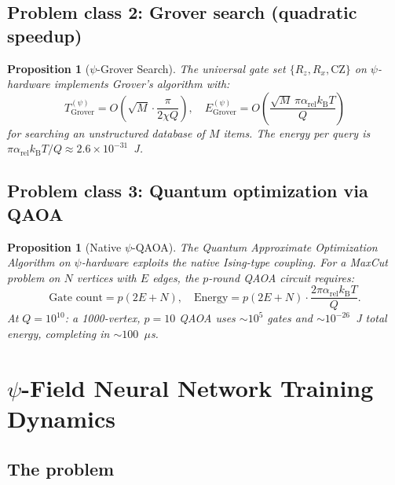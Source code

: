 \documentclass[11pt]{article}
\newtheorem{proposition}[theorem]{Proposition}
\theoremstyle{definition}
\theoremstyle{remark}
\newcommand{\kB}{k_{\mathrm{B}}}
\newcommand{\arel}{\alpha_{\mathrm{rel}}}
\begin{document}
\subsection{Problem class 2: Grover search (quadratic speedup)}

\begin{proposition}[$\psi$-Grover Search]
The universal gate set $\{R_z, R_x, \mathrm{CZ}\}$ on $\psi$-hardware
implements Grover's algorithm with:
\begin{equation}
\boxed{
T_{\mathrm{Grover}}^{(\psi)} = O\!\left(\sqrt{M}\cdot\frac{\pi}{2\chi Q}\right),
\quad E_{\mathrm{Grover}}^{(\psi)} = O\!\left(\frac{\sqrt{M}\,\pi\arel\kB T}{Q}\right)
}
\label{eq:grover}
\end{equation}
for searching an unstructured database of $M$ items. The energy per
query is $\pi\arel\kB T/Q \approx 2.6\times10^{-31}$~J.
\end{proposition}

\subsection{Problem class 3: Quantum optimization via QAOA}

\begin{proposition}[Native $\psi$-QAOA]
\label{prop:qaoa}
The Quantum Approximate Optimization Algorithm on $\psi$-hardware
exploits the native Ising-type coupling. For a MaxCut problem on
$N$ vertices with $E$ edges, the $p$-round QAOA circuit requires:
\begin{equation}
\text{Gate count} = p(2E + N),\quad
\text{Energy} = p(2E+N)\cdot\frac{2\pi\arel\kB T}{Q}.
\end{equation}
At $Q = 10^{10}$: a 1000-vertex, $p=10$ QAOA uses $\sim 10^5$ gates
and $\sim 10^{-26}$~J total energy, completing in $\sim 100$~$\mu$s.
\end{proposition}


\section{$\psi$-Field Neural Network Training Dynamics}
\label{sec:neural-training}

\subsection{The problem}
\end{document}
